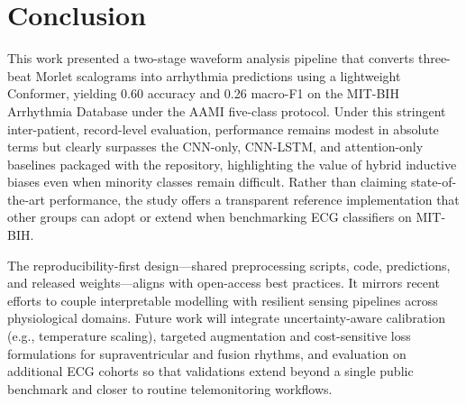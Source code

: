 \section{Conclusion}
This work presented a two-stage waveform analysis pipeline that converts three-beat Morlet scalograms into arrhythmia predictions using a lightweight Conformer, yielding 0.60 accuracy and 0.26 macro-F1 on the MIT-BIH Arrhythmia Database under the AAMI five-class protocol. Under this stringent inter-patient, record-level evaluation, performance remains modest in absolute terms but clearly surpasses the CNN-only, CNN-LSTM, and attention-only baselines packaged with the repository, highlighting the value of hybrid inductive biases even when minority classes remain difficult. Rather than claiming state-of-the-art performance, the study offers a transparent reference implementation that other groups can adopt or extend when benchmarking ECG classifiers on MIT-BIH.

The reproducibility-first design—shared preprocessing scripts, code, predictions, and released weights—aligns with open-access best practices. It mirrors recent efforts to couple interpretable modelling with resilient sensing pipelines across physiological domains.\cite{Jiang2025Hybrid,Stern2024InBed,Aslan2025Poincare} Future work will integrate uncertainty-aware calibration (e.g., temperature scaling), targeted augmentation and cost-sensitive loss formulations for supraventricular and fusion rhythms, and evaluation on additional ECG cohorts so that validations extend beyond a single public benchmark and closer to routine telemonitoring workflows.

